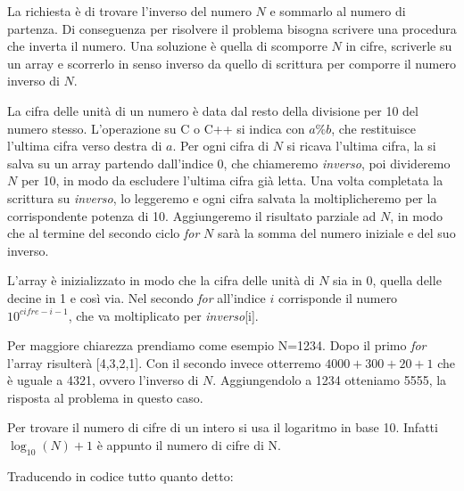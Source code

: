
La richiesta è di trovare l'inverso del numero $N$ e sommarlo al numero di partenza. Di conseguenza per risolvere il problema bisogna scrivere una procedura che inverta il numero.
Una soluzione è quella di scomporre $N$ in cifre, scriverle su un array e scorrerlo in senso inverso da quello di scrittura per comporre il numero inverso di $N$. 

La cifra delle unità di un numero è data dal resto della divisione per 10 del numero stesso. L'operazione su C o C++ si indica con $a\%b$, che restituisce l'ultima cifra verso destra di $a$. Per ogni cifra di $N$ si ricava l'ultima cifra, la si salva su un array partendo dall'indice 0, che chiameremo \textit{inverso}, poi divideremo $N$ per 10, in modo da escludere l'ultima cifra già letta. Una volta completata la scrittura su \textit{inverso}, lo leggeremo e ogni cifra salvata la moltiplicheremo per la corrispondente potenza di 10. Aggiungeremo il risultato parziale ad $N$, in modo che al termine del secondo ciclo \textit{for} $N$ sarà la somma del numero iniziale e del suo inverso.

L'array è inizializzato in modo che la cifra delle unità di $N$ sia in 0, quella delle decine in 1 e così via. Nel secondo \textit{for} all'indice $i$ corrisponde il numero $10^{cifre-i-1}$, che va moltiplicato per \textit{inverso}[i].

Per maggiore chiarezza prendiamo come esempio N=1234. Dopo il primo \textit{for} l'array risulterà [4,3,2,1]. Con il secondo invece otterremo $4000+300+20+1$ che è uguale a 4321, ovvero l'inverso di $N$. Aggiungendolo a 1234 otteniamo 5555, la risposta al problema in questo caso.

Per trovare il numero di cifre di un intero si usa il logaritmo in base 10. Infatti $\log_{10} \left (N \right )+ 1$ è appunto il numero di cifre di N.

Traducendo in codice tutto quanto detto:


\colorbox{white}{}
